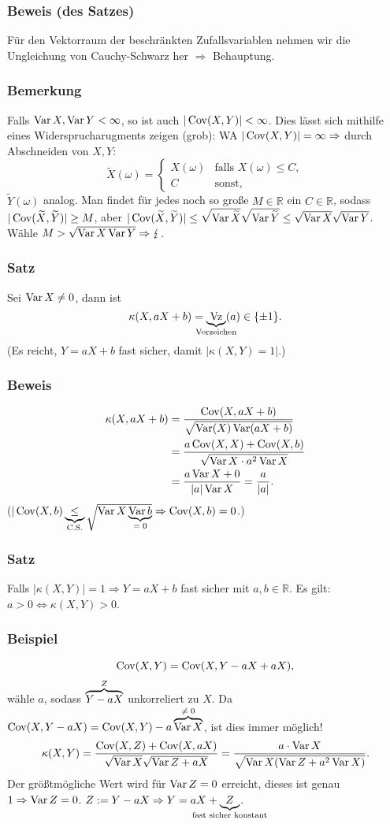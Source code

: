 \subsubsection{Beweis (des Satzes)}
F\"ur den Vektorraum der beschr\"ankten Zufallsvariablen nehmen wir die Ungleichung von Cauchy-Schwarz her $\Rightarrow$ Behauptung.
\subsubsection{Bemerkung}
Falls $\operatorname{Var} X,\operatorname{Var} Y<\infty$, so ist auch $|\operatorname{Cov}(X,Y)|<\infty$. Dies l\"asst sich mithilfe eines Widersprucharugments zeigen (grob): WA $|\operatorname{Cov}(X,Y)|=\infty\Rightarrow$ durch Abschneiden von $X,Y$:
\[
\widetilde{X}(\omega)=\begin{cases}
X(\omega)&\text{falls }X(\omega)\leq C,\\
C&\text{sonst,}
\end{cases}
\]
$\widetilde{Y}(\omega)$ analog. Man findet f\"ur jedes noch so gro\ss{}e $M\in\mathbb{R}$ ein $C\in\mathbb{R}$, sodass $|\operatorname{Cov}(\widetilde{X},\widetilde{Y})|\geq M$, aber $|\operatorname{Cov}(\widetilde{X},\widetilde{Y})|\leq\sqrt{\operatorname{Var}\widetilde{X}}\sqrt{\operatorname{Var}\widetilde{Y}}\leq\sqrt{\operatorname{Var} X}\sqrt{\operatorname{Var} Y}$. W\"ahle $M>\sqrt{\operatorname{Var} X\operatorname{Var} Y}\Rightarrow\lightning$.
\subsubsection{Satz}
Sei $\operatorname{Var} X\neq 0$, dann ist
\[
\kappa(X,aX+b)=\ubr{\Vz}{Vorzeichen}(a)\in\{\pm 1\}.
\]
(Es reicht, $Y=aX+b$ fast sicher, damit $|\kappa(X,Y)=1|$.)
\subsubsection{Beweis}
\begin{align*}
\kappa(X,aX+b)&=\frac{\operatorname{Cov}(X,aX+b)}{\sqrt{\operatorname{Var}(X)\operatorname{Var}(aX+b)}}\\
&=\frac{a\operatorname{Cov}(X,X)+\operatorname{Cov}(X,b)}{\sqrt{\operatorname{Var} X\cdot a^2\operatorname{Var} X}}\\
&=\frac{a\operatorname{Var} X+0}{|a|\operatorname{Var} X}=\frac{a}{|a|}.
\end{align*}
($|\Cov(X,b)\ubr{\leq}{C.S.}\sqrt{\Var X\ubr{\Var b}{$=0$}}\Rightarrow\Cov(X,b)=0$.)
\subsubsection{Satz}
Falls $|\kappa(X,Y)|=1\Rightarrow Y=aX+b$ fast sicher mit $a,b\in\mathbb{R}$. Es gilt: $a>0\Leftrightarrow\kappa(X,Y)>0$.
\subsubsection{Beispiel}
\[
\operatorname{Cov}(X,Y)=\operatorname{Cov}(X,Y-aX+aX),
\]
w\"ahle $a$, sodass $\obr{Y-aX}{$Z$}$ unkorreliert zu $X$. Da $\Cov(X,Y-aX)=\Cov(X,Y)-a\obr{\Var X}{$\neq0$}$, ist dies immer m\"oglich!
\[
\kappa(X,Y)=\frac{\operatorname{Cov}(X,Z)+\operatorname{Cov}(X,aX)}{\sqrt{\operatorname{Var} X}\sqrt{\operatorname{Var} Z+aX}}=\frac{a\cdot\operatorname{Var} X}{\sqrt{\operatorname{Var} X(\operatorname{Var} Z+a^2\operatorname{Var} X)}}.
\]
Der gr\"o\ss{}tm\"ogliche Wert wird f\"ur $\operatorname{Var} Z=0$ erreicht, dieses ist genau $1\Rightarrow\operatorname{Var} Z=0$. $Z:=Y-aX\Rightarrow Y=aX+\ubr{Z}{fast sicher konstant}$.
